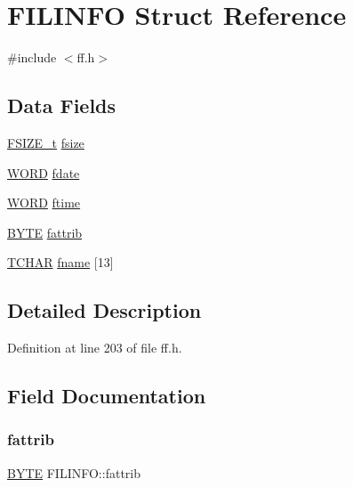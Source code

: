 \hypertarget{structFILINFO}{}\section{F\+I\+L\+I\+N\+FO Struct Reference}
\label{structFILINFO}


{\ttfamily \#include $<$ff.\+h$>$}

\subsection*{Data Fields}
\begin{DoxyCompactItemize}
\item 
\hyperlink{ff_8h_a3fc0992ad7436250b6b1a0592214b7f2}{F\+S\+I\+Z\+E\+\_\+t} \hyperlink{structFILINFO_a9e5b78ed7190f73de3ebcbdfbd6d1844}{fsize}
\item 
\hyperlink{integer_8h_a197942eefa7db30960ae396d68339b97}{W\+O\+RD} \hyperlink{structFILINFO_a7c01c48a15b1b49da459924437b0bd52}{fdate}
\item 
\hyperlink{integer_8h_a197942eefa7db30960ae396d68339b97}{W\+O\+RD} \hyperlink{structFILINFO_ae0f751b79621bf7b29669f177bbe6b9a}{ftime}
\item 
\hyperlink{lz4_8c_a4ae1dab0fb4b072a66584546209e7d58}{B\+Y\+TE} \hyperlink{structFILINFO_a838d542585831b085537b363f18205c0}{fattrib}
\item 
\hyperlink{ff_8h_a03bdb8ce5895c7e261aadc2529637546}{T\+C\+H\+AR} \hyperlink{structFILINFO_abd852510f2f79b4ec773156d8942dc7c}{fname} \mbox{[}13\mbox{]}
\end{DoxyCompactItemize}


\subsection{Detailed Description}


Definition at line 203 of file ff.\+h.



\subsection{Field Documentation}
\mbox{\label{structFILINFO_a838d542585831b085537b363f18205c0}} 
\subsubsection{\texorpdfstring{fattrib}{fattrib}}
{\footnotesize\ttfamily \hyperlink{lz4_8c_a4ae1dab0fb4b072a66584546209e7d58}{B\+Y\+TE} F\+I\+L\+I\+N\+F\+O\+::fattrib}



